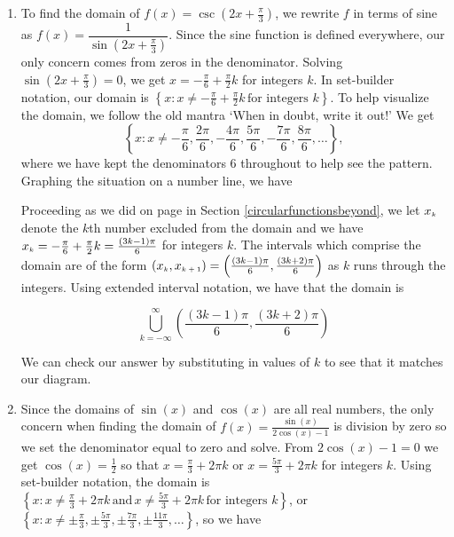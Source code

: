 {
\begin{enumerate}

\item  To find the domain of $f(x) = \csc\left(2x + \frac{\pi}{3}\right)$, we rewrite $f$ in terms of sine as $f(x) = \dfrac{1}{\sin\left(2x + \frac{\pi}{3}\right)}$.  Since the sine function is defined everywhere, our only concern comes from zeros in the denominator.  Solving $\sin\left(2x + \frac{\pi}{3}\right) = 0$, we get $x = -\frac{\pi}{6} + \frac{\pi}{2} k$ for integers $k$.  In set-builder notation, our domain is  $\left\{ x : x \neq  -\frac{\pi}{6} + \frac{\pi}{2} k \, \text{for integers $k$} \right\}$.  To help visualize the domain,  we follow the old mantra `When in doubt, write it out!' We get 
\[
\left\{ x : x \neq  -\frac{\pi}{6}, \frac{2\pi}{6}, -\frac{4\pi}{6}, \frac{5\pi}{6}, -\frac{7\pi}{6}, \frac{8\pi}{6}, \ldots \right\},
\]
where we have kept the denominators $6$ throughout to help see the pattern.  Graphing the situation on a number line, we have

\begin{center}
\end{center}

Proceeding as we did on page \pageref{extendedinterval} in Section \ref{circularfunctionsbeyond}, we let $x_{\mbox{\tiny $k$}}$ denote the $k$th number excluded from the domain and we have  $x_{\mbox{\tiny $k$}} = -\frac{\pi}{6} + \frac{\pi}{2} k = \frac{(3k-1)\pi}{6}$ for integers $k$.  The intervals which comprise the domain are of the form $\left(x_{\mbox{\tiny $k$}}, x_{\mbox{\tiny $k+1$}}  \right) = \left(\frac{(3k-1)\pi}{6}, \frac{(3k+2)\pi}{6} \right)$ as $k$ runs through the integers.  Using extended interval notation, we have that the domain is

\[ \bigcup_{k = -\infty}^{\infty}  \left(\dfrac{(3k-1)\pi}{6}, \dfrac{(3k+2)\pi}{6} \right)\]

We can check our answer by substituting in values of $k$ to see that it matches our diagram.


\item  Since the domains of $\sin(x)$ and $\cos(x)$ are all real numbers, the only concern when finding the domain of  $f(x) =  \frac{\sin(x)}{2\cos(x) - 1}$ is division by zero so we set the denominator equal to zero and solve. From $2\cos(x) - 1 = 0$ we get $\cos(x) = \frac{1}{2}$ so that $x = \frac{\pi}{3} + 2\pi k$ or $x = \frac{5\pi}{3} + 2\pi k$ for integers $k$.  Using set-builder notation, the domain is $\left\{ x : x \neq \frac{\pi}{3} + 2\pi k \, \text{and} \, x \neq \frac{5\pi}{3} + 2\pi k \, \text{for integers $k$} \right\}$, or  $\left\{ x : x \neq \pm \frac{\pi}{3}, \pm \frac{5\pi}{3}, \pm \frac{7\pi}{3}, \pm \frac{11\pi}{3}, \ldots \right\}$, so we have


\end{enumerate}}
